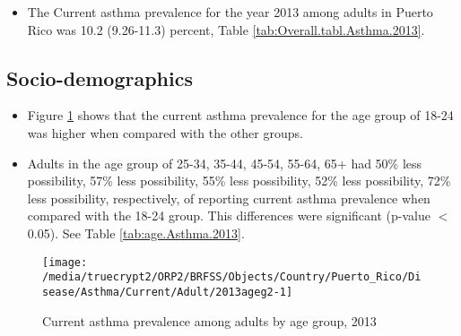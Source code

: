 \begin{itemize}


\item The Current asthma prevalence for the year 2013 among adults in Puerto Rico was 10.2 (9.26-11.3) percent, 
Table \ref{tab:Overall.tabl.Asthma.2013}.

\end{itemize}



\newpage
\subsection{Socio-demographics}

\begin{itemize}

\item Figure \ref{fig:age.Asthma.2013} shows that the current asthma prevalence for the age group of
18-24
was higher when compared with the other groups.

\item Adults in the age group of 25-34, 35-44, 45-54, 55-64, 65+ had 50\% less possibility, 57\% less possibility, 55\% less possibility, 52\% less possibility, 72\% less possibility, respectively, of reporting current asthma prevalence when compared with the 18-24 group. This differences were significant (p-value $<$ 0.05). See Table \ref{tab:age.Asthma.2013}.


\end{itemize}


\begin{figure}[H]
\caption{Current asthma prevalence among adults by age group, 
2013}
\begin{knitrout}
\color{fgcolor}

{\centering \texttt{[image: /media/truecrypt2/ORP2/BRFSS/Objects/Country/Puerto\_Rico/Disease/Asthma/Current/Adult/2013ageg2-1]} 

}



\end{knitrout}
\label{fig:age.Asthma.2013}
\end{figure}


